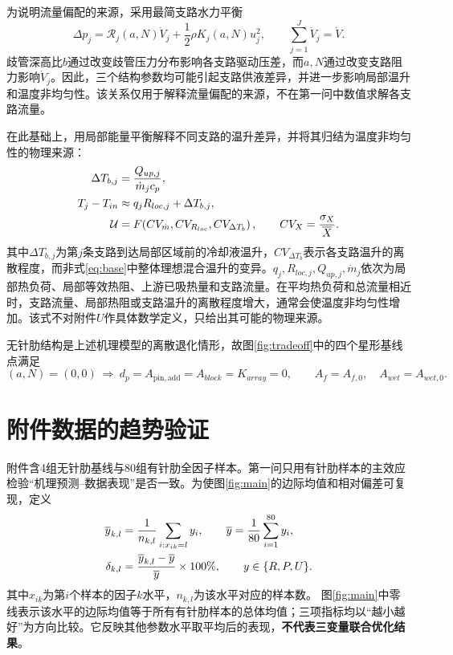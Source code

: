 \documentclass[UTF8,12pt,a4paper]{ctexart}
\begin{document}
为说明流量偏配的来源，采用最简支路水力平衡
\begin{equation}
\Delta p_j=\mathcal R_j(a,N)\dot V_j+\frac12\rho K_j(a,N)u_j^2,
\qquad \sum_{j=1}^{J}\dot V_j=\dot V.
\label{eq:branch_balance}
\end{equation}
歧管深高比$b$通过改变歧管压力分布影响各支路驱动压差，而$a,N$通过改变支路阻力影响$\dot V_j$。因此，三个结构参数均可能引起支路供液差异，并进一步影响局部温升和温度非均匀性。该关系仅用于解释流量偏配的来源，不在第一问中数值求解各支路流量。

在此基础上，用局部能量平衡解释不同支路的温升差异，并将其归结为温度非均匀性的物理来源：
\begin{align}
\Delta T_{b,j}&=\frac{Q_{up,j}}{\dot m_jc_p},\notag\\
T_j-T_{in}&\approx q_jR_{loc,j}+\Delta T_{b,j},\notag\\
\mathcal U&=F\!\left(CV_{\dot m},CV_{R_{loc}},CV_{\Delta T_b}\right),\qquad
CV_X=\frac{\sigma_X}{\overline X}.
\label{eq:uniformity}
\end{align}
其中$\Delta T_{b,j}$为第$j$条支路到达局部区域前的冷却液温升，$CV_{\Delta T_b}$表示各支路温升的离散程度，而非式\eqref{eq:base}中整体理想混合温升的变异。$q_j,R_{loc,j},Q_{up,j},\dot m_j$依次为局部热负荷、局部等效热阻、上游已吸热量和支路流量。在平均热负荷和总流量相近时，支路流量、局部热阻或支路温升的离散程度增大，通常会使温度非均匀性增加。该式不对附件$U$作具体数学定义，只给出其可能的物理来源。

无针肋结构是上述机理模型的离散退化情形，故图\ref{fig:tradeoff}中的四个星形基线点满足
\begin{equation}
(a,N)=(0,0)\ \Longrightarrow\ d_p=A_{\mathrm{pin,add}}=A_{block}=K_{array}=0,\qquad
A_f=A_{f,0},\quad A_{wet}=A_{wet,0}.
\label{eq:baseline}
\end{equation}

\section{附件数据的趋势验证}
附件含4组无针肋基线与80组有针肋全因子样本。第一问只用有针肋样本的主效应检验“机理预测--数据表现”是否一致。为使图\ref{fig:main}的边际均值和相对偏差可复现，定义
\begin{align}
\overline y_{k,l}&=\frac{1}{n_{k,l}}\sum_{i:x_{ik}=l}y_i,\qquad
\overline y=\frac1{80}\sum_{i=1}^{80}y_i,\notag\\
\delta_{k,l}&=\frac{\overline y_{k,l}-\overline y}{\overline y}\times100\%,\qquad y\in\{R,P,U\}.
\label{eq:main_effect}
\end{align}
其中$x_{ik}$为第$i$个样本的因子$k$水平，$n_{k,l}$为该水平对应的样本数。
图\ref{fig:main}中零线表示该水平的边际均值等于所有有针肋样本的总体均值；三项指标均以“越小越好”为方向比较。它反映其他参数水平取平均后的表现，\textbf{不代表三变量联合优化结果}。
\end{document}
